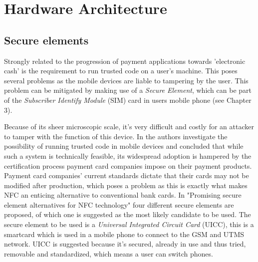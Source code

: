 \chapter{Hardware Architecture}
\label{chap:hardware_architecture}




\section{Secure elements}
Strongly related to the progression of payment applications towards 'electronic cash' is the requirement to run trusted code on a user's machine.
This poses several problems as the mobile devices are liable to tampering by the user.
This problem can be mitigated by making use of a \textit{Secure Element}, which can be part of the \textit{Subscriber Identify Module} (SIM) card in users mobile phone (see Chapter 3).

Because of its sheer microscopic scale, it's very difficult and costly for an attacker to tamper with the function of this device.
In \cite{1497411} the authors investigate the possibility of running trusted code in mobile devices and concluded that while such a system is technically feasible, its widespread adoption is hampered by the certification process payment card companies impose on their payment products.
Payment card companies' current standards dictate that their cards may not be modified after production, which poses a problem as this is exactly what makes NFC an enticing alternative to conventional bank cards.
In "Promising secure element alternatives for NFC technology" four different secure elements are proposed, of which one is suggested as the most likely candidate to be used.
The secure element to be used is a \textit{Universal Integrated Circuit Card} (UICC), this is a smartcard which is used in a mobile phone to connect to the GSM and UTMS network. %
UICC is suggested because it's secured, already in use and thus tried, removable and standardized, which means a user can switch phones. 

